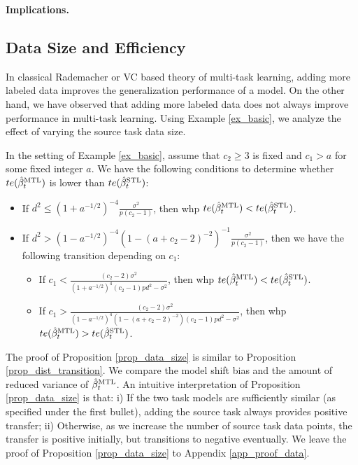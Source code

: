 \textbf{Implications.}


\subsection{Data Size and Efficiency}\label{sec_data_size}

In classical Rademacher or VC based theory of multi-task learning, adding more labeled data improves the generalization performance of a model.
On the other hand, we have observed that adding more labeled data does not always improve performance in multi-task learning.
Using Example \ref{ex_basic}, we analyze the effect of varying the source task data size.

\begin{proposition}\label{prop_data_size}
	In the setting of Example \ref{ex_basic}, assume that $c_2  \ge 3$ is fixed and $c_1 > a$ for some fixed integer $a$.	We have the following conditions to determine whether $te(\hat{\beta}_t^{\text{MTL}})$ is lower than $te(\hat{\beta}_t^{\text{STL}})$:
	\begin{itemize}
\item If $d^2 \le (1 + a^{-1/2})^{-4}\frac{\sigma^2}{p(c_2-1)}$, then whp $te(\hat{\beta}_t^{\text{MTL}}) < te(\hat{\beta}_t^{\text{STL}})$. 
		 
\item If $d^2 > (1 - a^{-1/2})^{-4}(1-(a+c_2-2)^{-2})^{-1}\frac{\sigma^2}{p (c_2 - 1)}$, then we have the following transition depending on $c_1$:
		\begin{itemize}
			\item If $c_1 < \frac{(c_2-2)\sigma^2}{(1+a^{-1/2})^4(c_2 - 1) pd^2 - \sigma^2}$, then whp $te(\hat{\beta}_t^{\text{MTL}}) < te(\hat{\beta}_t^{\text{STL}})$.
			\item If $c_1 > \frac{(c_2-2) \sigma^2}{(1-a^{-1/2})^4(1-(a+c_2-2)^{-2})(c_2 - 1) pd^2 - \sigma^2}$, then whp $te(\hat{\beta}_t^{\text{MTL}}) > te(\hat{\beta}_t^{\text{STL}})$.
		\end{itemize}
	\end{itemize}
\end{proposition}

The proof of Proposition \ref{prop_data_size} is similar to Proposition \ref{prop_dist_transition}.
We compare the model shift bias and the amount of reduced variance of $\hat{\beta}_t^{\text{MTL}}$.
An intuitive interpretation of Proposition \ref{prop_data_size} is that:
i) If the two task models are sufficiently similar (as specified under the first bullet), adding the source task always provides positive transfer;
ii) Otherwise, as we increase the number of source task data points, the transfer is positive initially, but transitions to negative eventually.
We leave the proof of Proposition \ref{prop_data_size} to Appendix \ref{app_proof_data}.

